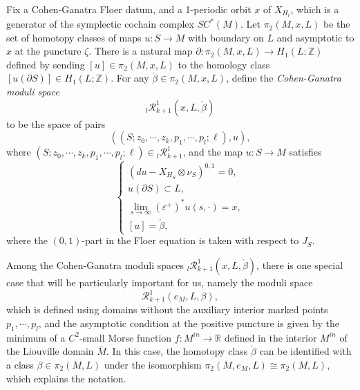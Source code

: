 \documentclass[a4paper]{article}
\numberwithin{equation}{section}
\begin{document}
Fix a Cohen-Ganatra Floer datum, and a 1-periodic orbit $x$ of $X_{H_t}$, which is a generator of the symplectic cochain complex $\mathit{SC}^\ast(M)$. Let $\pi_2(M,x,L)$ be the set of homotopy classes of maps $u:S\rightarrow M$ with boundary on $L$ and asymptotic to $x$ at the puncture $\zeta$. There is a natural map $\partial:\pi_2(M,x,L)\rightarrow H_1(L;\mathbb{Z})$ defined by sending $[u]\in\pi_2(M,x,L)$ to the homology class $[u(\partial S)]\in H_1(L;\mathbb{Z})$. For any $\ring{\beta}\in\pi_2(M,x,L)$, define the \textit{Cohen-Ganatra moduli space}
\begin{equation}
{}_l\mathcal{R}_{k+1}^1(x,L,\ring{\beta})
\end{equation}
to be the space of pairs
\begin{equation}\label{eq:pair}
\left((S;z_0,\cdots,z_k,p_1,\cdots,p_l;\ell),u\right),
\end{equation}
where $(S;z_0,\cdots,z_k,p_1,\cdots,p_l;\ell)\in{}_l\mathcal{R}^1_{k+1}$, and the map $u:S\rightarrow M$ satisfies
\begin{equation}\label{eq:CR}
\left\{\begin{array}{l}
(du-X_{H_S}\otimes\nu_S)^{0,1}=0, \\
u(\partial S)\subset L, \\
\lim_{s\rightarrow\infty}(\varepsilon^+)^\ast u(s,\cdot)=x, \\
{[u]}=\ring{\beta},
\end{array}\right.
\end{equation}
where the $(0,1)$-part in the Floer equation is taken with respect to $J_S$.

Among the Cohen-Ganatra moduli spaces ${}_l\mathcal{R}_{k+1}^1(x,L,\ring{\beta})$, there is one special case that will be particularly important for us, namely the moduli space
\begin{equation}
\mathcal{R}_{k+1}^1(e_M,L,\beta),
\end{equation}
which is defined using domains without the auxiliary interior marked points $p_1,\cdots,p_l$, and the asymptotic condition at the positive puncture is given by the minimum of a $C^2$-small Morse function $f:M^\mathit{in}\rightarrow\mathbb{R}$ defined in the interior $M^\mathit{in}$ of the Liouville domain $\overline{M}$. In this case, the homotopy class $\ring{\beta}$ can be identified with a class $\beta\in\pi_2(M,L)$ under the isomorphism $\pi_2(M,e_M,L)\cong\pi_2(M,L)$, which explains the notation.
\end{document}
